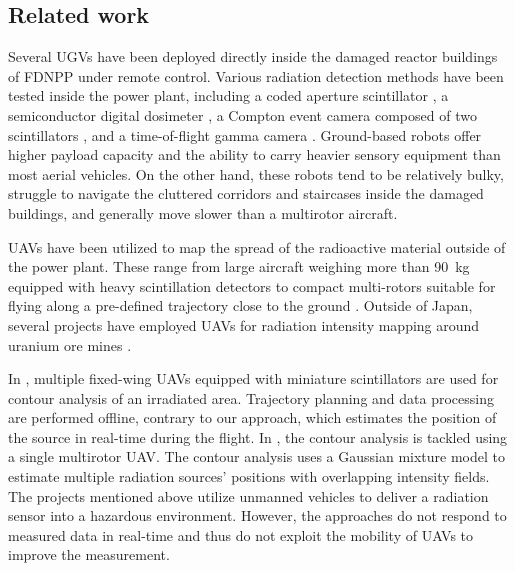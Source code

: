 \documentclass[a4paper,11pt,titlepage,twoside]{book}
\begin{document}


\subsection{Related work}



Several \acp{UGV} have been deployed directly inside the damaged reactor buildings of \ac{FDNPP} under remote control.
Various radiation detection methods have been tested inside the power plant, including a coded aperture scintillator \cite{ohno2011robotic}, a semiconductor digital dosimeter \cite{nagatani2013emergency}, a Compton event camera composed of two scintillators \cite{sato2019radiation}, and a time-of-flight gamma camera \cite{kinoshita2014development}.
Ground-based robots offer higher payload capacity and the ability to carry heavier sensory equipment than most aerial vehicles.
On the other hand, these robots tend to be relatively bulky, struggle to navigate the cluttered corridors and staircases inside the damaged buildings, and generally move slower than a multirotor aircraft.

\acp{UAV} have been utilized to map the spread of the radioactive material outside of the power plant.
These range from large aircraft weighing more than \SI{90}{\kilogram} equipped with heavy scintillation detectors \cite{sanada2015aerial, towler2012radiation, jiang2016prototype}
to compact multi-rotors suitable for flying along a pre-defined trajectory close to the ground \cite{macfarlane2014lightweight, christie2017radiation, martin20163d}.
Outside of Japan, several projects have employed \acp{UAV} for radiation intensity mapping around uranium ore mines \cite{salek2018mapping, keatley2018source, martin2015use}.

In \cite{han2013lowcost}, multiple fixed-wing \acp{UAV} equipped with miniature scintillators are used for contour analysis of an irradiated area.
Trajectory planning and data processing are performed offline, contrary to our approach, which estimates the position of the source in real-time during the flight.
In \cite{newaz2016uav}, the contour analysis is tackled using a single multirotor \ac{UAV}. The contour analysis uses a Gaussian mixture model to estimate multiple radiation sources' positions with overlapping intensity fields.
The projects mentioned above utilize unmanned vehicles to deliver a radiation sensor into a hazardous environment.
However, the approaches do not respond to measured data in real-time and thus do not exploit the mobility of \acp{UAV} to improve the measurement.
\end{document}
